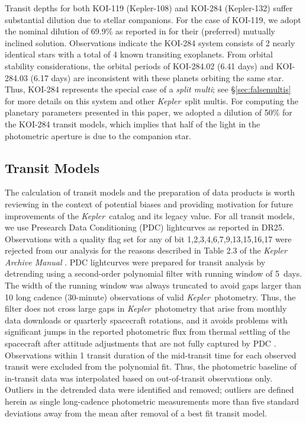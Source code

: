 \documentclass{aastex62}
\newcommand{\ik}{{\it Kepler~}}
\begin{document}
Transit depths for both KOI-119 (Kepler-108) and KOI-284 (Kepler-132) suffer substantial dilution due to stellar companions.  For the case of KOI-119, we adopt the nominal dilution of 69.9\% as reported in \cite{Mills:2017a} for their (preferred) mutually inclined solution.  Observations indicate the KOI-284 system consists of 2 nearly identical stars with a total of 4 known transiting exoplanets.  From orbital stability considerations, the orbital periods of KOI-284.02 (6.41 days) and KOI-284.03 (6.17 days) are inconsistent with these planets orbiting the same star.  Thus, KOI-284 represents the special case of a {\it split multi}; see \S\ref{sec:falsemultis} for more details on this system and other \ik split multis.  For computing the planetary parameters presented in this paper, we adopted a dilution of 50\% for the KOI-284 transit models, which implies that half of the light in the photometric aperture is due to the companion star.
 
\subsection{Transit Models}\label{sec:transitmodel}

The calculation of transit models and the preparation of data products is worth reviewing in the context of potential biases and providing motivation for future improvements of the \ik catalog and its legacy value.  For all transit models, we use Presearch Data Conditioning (PDC) lightcurves \citep{Stumpe:2014} as reported in DR25.  {Observations with a quality flag set for any of bit 1,2,3,4,6,7,9,13,15,16,17 were rejected from our analysis for the reasons described in Table 2.3 of the {\it Kepler Archive Manual} \citep{Thompson:2016}.}  PDC lightcurves were prepared for transit analysis by detrending using a second-order polynomial filter with running window of 5~days.  The width of the running window was always truncated to avoid gaps larger than 10 long cadence (30-minute) observations of valid \ik photometry.  Thus, the filter does not cross large gaps in \ik photometry that arise from monthly data downloads or quarterly spacecraft rotations, and it avoids problems with significant jumps in the reported photometric flux from thermal settling of the spacecraft after attitude adjustments that are not fully captured by PDC \citep{vanCleve:2016}.  Observations within 1 transit duration of the mid-transit time for each observed transit were excluded from the polynomial fit.  Thus, the photometric baseline of in-transit data was interpolated based on out-of-transit observations only.  Outliers in the detrended data were identified and removed; outliers are defined herein as single long-cadence photometric measurements more than five standard deviations away from the mean after removal of a best fit transit model.
\end{document}
